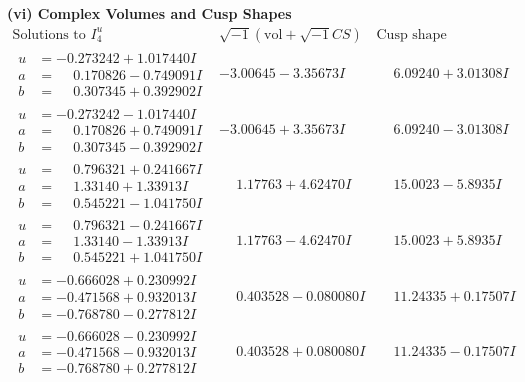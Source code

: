 \documentclass[1p]{elsarticle_modified}
\theoremstyle{definition}
\newcommand{\I}{\sqrt{-1}}
\begin{document}
\newpage\flushleft \textbf{(vi) Complex Volumes and Cusp Shapes}
$$\begin{array}{c|c|c}  
\text{Solutions to }I^u_{4}& \I (\text{vol} + \sqrt{-1}CS) & \text{Cusp shape}\\
 \hline 
\begin{aligned}
u &= -0.273242 + 1.017440 I \\
a &= \phantom{-}0.170826 - 0.749091 I \\
b &= \phantom{-}0.307345 + 0.392902 I\end{aligned}
 & -3.00645 - 3.35673 I & \phantom{-}6.09240 + 3.01308 I \\ \hline\begin{aligned}
u &= -0.273242 - 1.017440 I \\
a &= \phantom{-}0.170826 + 0.749091 I \\
b &= \phantom{-}0.307345 - 0.392902 I\end{aligned}
 & -3.00645 + 3.35673 I & \phantom{-}6.09240 - 3.01308 I \\ \hline\begin{aligned}
u &= \phantom{-}0.796321 + 0.241667 I \\
a &= \phantom{-}1.33140 + 1.33913 I \\
b &= \phantom{-}0.545221 - 1.041750 I\end{aligned}
 & \phantom{-}1.17763 + 4.62470 I & \phantom{-}15.0023 - 5.8935 I \\ \hline\begin{aligned}
u &= \phantom{-}0.796321 - 0.241667 I \\
a &= \phantom{-}1.33140 - 1.33913 I \\
b &= \phantom{-}0.545221 + 1.041750 I\end{aligned}
 & \phantom{-}1.17763 - 4.62470 I & \phantom{-}15.0023 + 5.8935 I \\ \hline\begin{aligned}
u &= -0.666028 + 0.230992 I \\
a &= -0.471568 + 0.932013 I \\
b &= -0.768780 - 0.277812 I\end{aligned}
 & \phantom{-}0.403528 - 0.080080 I & \phantom{-}11.24335 + 0.17507 I \\ \hline\begin{aligned}
u &= -0.666028 - 0.230992 I \\
a &= -0.471568 - 0.932013 I \\
b &= -0.768780 + 0.277812 I\end{aligned}
 & \phantom{-}0.403528 + 0.080080 I & \phantom{-}11.24335 - 0.17507 I \\ \hline\begin{aligned}

\end{aligned}
\end{array}$$
\end{document}
